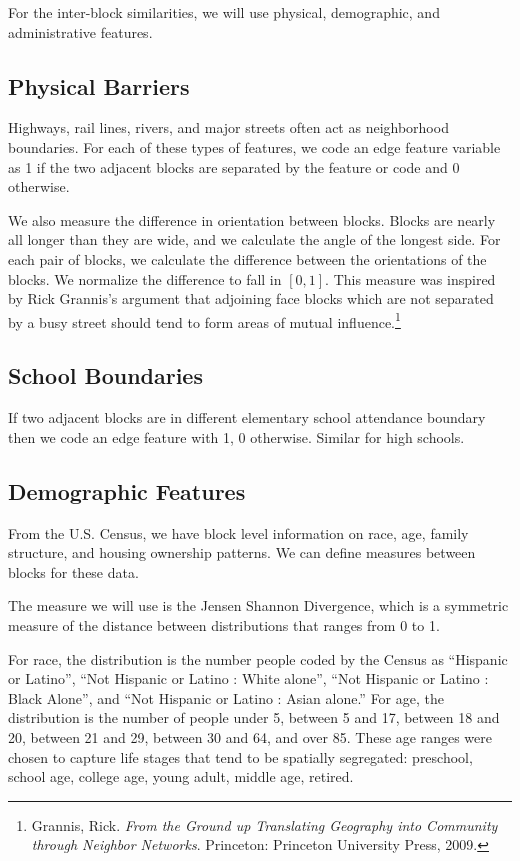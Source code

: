 \documentclass[12pt,letter]{article}\usepackage[]{graphicx}\usepackage[]{color}
\begin{document}
For the inter-block similarities, we will use physical, demographic, and
administrative features.

\subsection*{Physical Barriers}
Highways, rail lines, rivers, and major streets often act as neighborhood
boundaries. For each of these types of features, we code an edge feature
variable as 1 if the two adjacent blocks are separated by the feature or code
and 0 otherwise.

We also measure the difference in orientation between blocks. Blocks
are nearly all longer than they are wide, and we calculate the angle
of the longest side. For each pair of blocks, we calculate the
difference between the orientations of the blocks. We normalize the
difference to fall in $[0, 1]$. This measure was inspired by Rick
Grannis’s argument that adjoining face blocks which are not separated
by a busy street should tend to form areas of mutual
influence.\footnote{Grannis, Rick. \emph{From the Ground up
    Translating Geography into Community through Neighbor
    Networks}. Princeton: Princeton University Press, 2009.}

\subsection*{School Boundaries}
If two adjacent blocks are in different elementary school attendance boundary
then we code an edge feature with 1, 0 otherwise. Similar for high schools.

\subsection*{Demographic Features}
From the U.S. Census, we have block level information on race, age, family
structure, and housing ownership patterns. We can define measures between
blocks for these data.

The measure we will use is the Jensen Shannon Divergence, which is a
symmetric measure of the distance between distributions that ranges from 0
to 1.

For race, the distribution is the number people coded by the Census as
``Hispanic or Latino'', ``Not Hispanic or Latino : White alone'', ``Not Hispanic
or Latino : Black Alone'', and ``Not Hispanic or Latino : Asian alone.''
For age, the distribution is the number of people under 5, between 5 and
17, between 18 and 20, between 21 and 29, between 30 and 64, and over
85. These age ranges were chosen to capture life stages that tend to be
spatially segregated: preschool, school age, college age, young adult, middle
age, retired.
\end{document}
